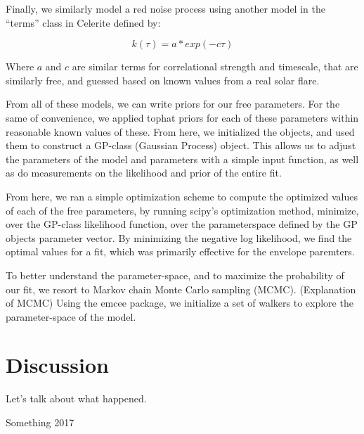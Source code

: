 \documentclass{aastex61}
\begin{document}
Finally, we similarly model a red noise process using another model in the ``terms'' class in Celerite defined by:

\begin{equation}
	k(\tau) = a * exp(-c\tau)
	\label{rednoise}
\end{equation}

Where $a$ and $c$ are similar terms for correlational strength and timescale, that are similarly free, and guessed based on known values from a real solar flare.

From all of these models, we can write priors for our free parameters. For the same of convenience, we applied tophat priors for each of these parameters within reasonable known values of these. From here, we initialized the objects, and used them to construct a GP-class (Gaussian Process) object. This allows us to adjust the parameters of the model and parameters with a simple input function, as well as do measurements on the likelihood and prior of the entire fit.

From here, we ran a simple optimization scheme to compute the optimized values of each of the free parameters, by running scipy's optimization method, minimize, over the GP-class likelihood function, over the parameterspace defined by the GP objects parameter vector. By minimizing the negative log likelihood, we find the optimal values for a fit, which was primarily effective for the envelope paremters.

To better understand the parameter-space, and to maximize the probability of our fit, we resort to Markov chain Monte Carlo sampling (MCMC). (Explanation of MCMC)
Using the emcee package, we initialize a set of walkers to explore the parameter-space of the model.


\section{Discussion} \label{sec:discussion}
Let's talk about what happened.





\begin{thebibliography}{}
	Something 2017
\end{thebibliography}
\end{document}

